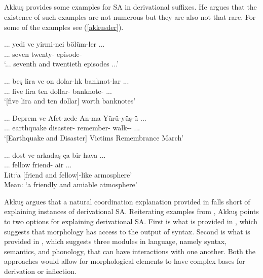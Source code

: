 \subsection{\cite{akkucs2016suspended}}

Akkuş provides some examples for SA in derivational suffixes. He argues that the existence of such examples are not numerous but they are also not that rare. For some of the examples see (\ref{akkusder}).

\begin{exe}
\ex \label{akkusder}
\begin{xlist}
    \ex \gll ... yedi ve yirmi-nci bölüm-ler ... \\ ... seven {\And} twenty-{\Der} episode-{\Pl} \\
    \glt `... seventh and twentieth episodes ...'
    
    \ex \gll ... beş lira ve on dolar-lık banknot-lar ... \\ ... five lira {\And} ten dollar-{\Der} banknote-{\Pl} ... \\
    \glt `[five lira and ten dollar] worth banknotes'
    
    \ex \gll ... Deprem ve Afet-zede An-ma Yürü-yüş-ü ... \\ ... earthquake {\And} disaster-{\Der} remember-{\Nmlz} walk-{\Nmlz}-{\Acc} ... \\ 
    \glt `[Earthquake and Disaster] Victims Remembrance March'
    
    \ex \gll ... dost ve arkadaş-ça bir hava ... \\ ... fellow {\And} friend-{\Der} {\Det} air ... \\
    \glt Lit:`a [friend and fellow]-like armosphere' \\ Mean: `a friendly and amiable atmosphere'
\end{xlist}
\end{exe}

Akkuş argues that a natural coordination explanation \citep{walchli2005co} provided in \cite{kabak2007turkish} falls short of explaining instances of derivational SA. Reiterating examples from \cite{ackema2004beyond, lieber2006lexical}, Akkuş points to two options for explaining derivational SA. First is what is provided in \cite{lieber2006lexical}, which suggests that morphology has access to the output of syntax. Second is what is provided in \cite{ackema2004beyond}, which suggests three modules in language, namely syntax, semantics, and phonology, that can have interactions with one another. Both the approaches would allow for morphological elements to have complex bases for derivation or inflection.
